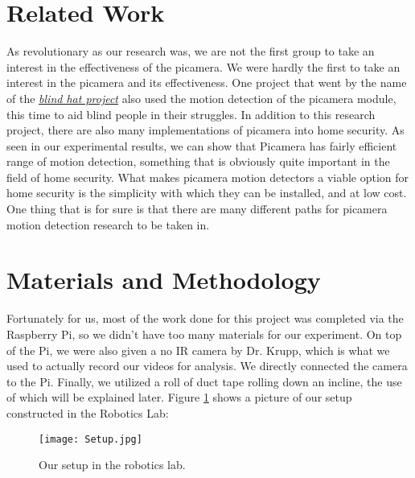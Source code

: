 \documentclass[sigsmall]{acmart}
\begin{document}
\section*{Related Work}
As revolutionary as our research was, we are not the first group to take an interest in the effectiveness of the picamera. We were hardly the first to take an interest in the picamera and its effectiveness. One project that went by the name of the \href{https://www.hackster.io/ardy345678903456789/blind-hat-helper-9e4667}{\emph{blind hat project}} \cite{blindhat} also used the motion detection of the picamera module, this time to aid blind people in their struggles. In addition to this research project, there are also many implementations of picamera into home security. As seen in our experimental results, we can show that Picamera has fairly efficient range of motion detection, something that is obviously quite important in the field of home security.  What makes picamera motion detectors a viable option for home security is the simplicity with which they can be installed, and at low cost. One thing that is for sure is that there are many different paths for picamera motion detection research to be taken in.  

\section*{Materials and Methodology}
Fortunately for us, most of the work done for this project was completed via the Raspberry Pi, so we didn't have too many materials for our experiment.  On top of the Pi, we were also given a no IR camera by Dr. Krupp, which is what we used to actually record our videos for analysis.  We directly connected the camera to the Pi.  Finally, we utilized a roll of duct tape rolling down an incline, the use of which will be explained later.  Figure \ref{fig:setup} shows a picture of our setup constructed in the Robotics Lab:

\begin{figure}[h!]
	\texttt{[image: Setup.jpg]}
	\caption{Our setup in the robotics lab.}
	\label{fig:setup}
\end{figure}
\end{document}

